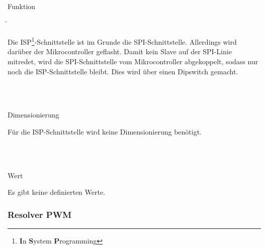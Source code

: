 \begin{tabbing}
\parbox[t]{.25\textwidth}{

Funktion

} \=\parbox[t]{.75\textwidth}{

Die ISP\footnote{\textbf{I}n \textbf{S}ystem \textbf{P}rogramming}-Schnittstelle ist im Grunde die SPI-Schnittstelle. Allerdings wird darüber der Mikrocontroller geflasht. Damit kein Slave auf der SPI-Linie mitredet, wird die SPI-Schnittstelle vom Mikrocontroller abgekoppelt, sodass nur noch die ISP-Schnittstelle bleibt. Dies wird über einen Dipswitch gemacht.


}\\
\\
\parbox[t]{.25\textwidth}{

Dimensionierung

} \>\parbox[t]{.75\textwidth}{

Für die ISP-Schnittstelle wird keine Dimensionierung benötigt.

}\\
\\
\parbox[t]{.25\textwidth}{

Wert

} \>\parbox[t]{.75\textwidth}{

Es gibt keine definierten Werte.\\



}
\end{tabbing}


\subsubsection{Resolver PWM}\label{subsubsec:Resolver_PWM_Mikrocontroller}

